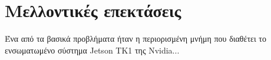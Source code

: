 \chapter{Μελλοντικές επεκτάσεις}
\label{chapter:future_work}

Ένα από τα βασικά προβλήματα ήταν η περιορισμένη μνήμη που διαθέτει
το ενσωματωμένο σύστημα Jetson TK1 της Nvidia...
